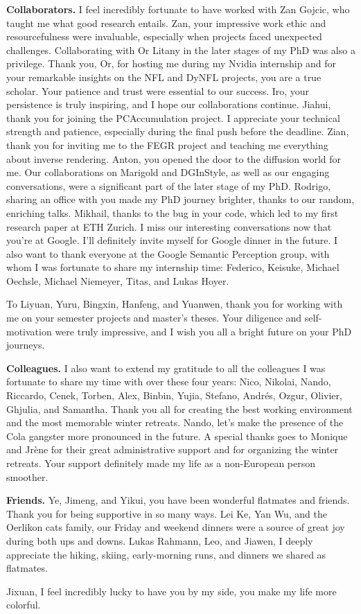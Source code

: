 \noindent
\textbf{Collaborators.}
I feel incredibly fortunate to have worked with Zan Gojcic, who taught me what good research entails. Zan, your impressive work ethic and resourcefulness were invaluable, especially when projects faced unexpected challenges. Collaborating with Or Litany in the later stages of my PhD was also a privilege. Thank you, Or, for hosting me during my Nvidia internship and for your remarkable insights on the NFL and DyNFL projects, you are a true scholar. Your patience and trust were essential to our success. Iro, your persistence is truly inspiring, and I hope our collaborations continue. Jiahui, thank you for joining the PCAccumulation project. I appreciate your technical strength and patience, especially during the final push before the deadline. Zian, thank you for inviting me to the FEGR project and teaching me everything about inverse rendering. Anton, you opened the door to the diffusion world for me. Our collaborations on Marigold and DGInStyle, as well as our engaging conversations, were a significant part of the later stage of my PhD. Rodrigo, sharing an office with you made my PhD journey brighter, thanks to our random, enriching talks. Mikhail, thanks to the bug in your code, which led to my first research paper at ETH Zurich. I miss our interesting conversations now that you're at Google. I'll definitely invite myself for Google dinner in the future. I also want to thank everyone at the Google Semantic Perception group, with whom I was fortunate to share my internship time: Federico, Keisuke, Michael Oechsle, Michael Niemeyer, Titas, and Lukas Hoyer.

To Liyuan, Yuru, Bingxin, Hanfeng, and Yuanwen, thank you for working with me on your semester projects and master's theses. Your diligence and self-motivation were truly impressive, and I wish you all a bright future on your PhD journeys.

\noindent
\textbf{Colleagues.}
I also want to extend my gratitude to all the colleagues I was fortunate to share my time with over these four years: Nico, Nikolai, Nando, Riccardo, Cenek, Torben, Alex, Binbin, Yujia, Stefano, Andrés, Ozgur, Olivier, Ghjulia, and Samantha. Thank you all for creating the best working environment and the most memorable winter retreats. Nando, let's make the presence of the Cola gangster more pronounced in the future. A special thanks goes to Monique and Jrène for their great administrative support and for organizing the winter retreats. Your support definitely made my life as a non-European person smoother. 

\noindent
\textbf{Friends.}
Ye, Jimeng, and Yikui, you have been wonderful flatmates and friends. Thank you for being supportive in so many ways. Lei Ke, Yan Wu, and the Oerlikon cats family, our Friday and weekend dinners were a source of great joy during both ups and downs. Lukas Rahmann, Leo, and Jiawen, I deeply appreciate the hiking, skiing, early-morning runs, and dinners we shared as flatmates.

Jixuan, I feel incredibly lucky to have you by my side, you make my life more colorful.
